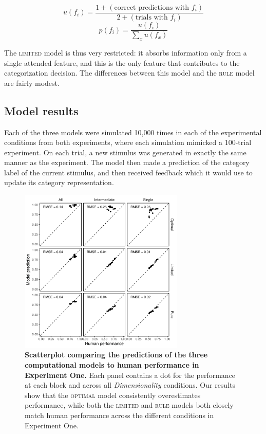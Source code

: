 \documentclass[a4paper, doc, floatsintext]{apa6}
\newcommand{\text}{\mbox}
\begin{document}
\begin{equation}
u(f_{i}) = \frac{ 1 + (\text{correct predictions with } f_{i})}{2 +  (\text{trials with } f_{i})}
\label{limited-prototype-u}
\end{equation}
\begin{equation}
p(f_{i}) = \frac{u(f_{i})}{ \sum_{x} u(f_{x})}
\label{limited-prototype-switch}
\end{equation}

The \textsc{limited} model is thus very restricted: it absorbs information only from a single attended feature, and this is the only feature that contributes to the categorization decision. The differences between this model and the \textsc{rule} model are fairly modest.

\subsection{Model results}

Each of the three models were simulated 10,000 times in each of the experimental conditions from both experiments, where each simulation mimicked a 100-trial experiment. On each trial, a new stimulus was generated in exactly the same manner as the experiment. The model then made a prediction of the category label of the current stimulus, and then received feedback which it would use to update its category representation.

\begin{figure}[h!]
  \begin{center}
    \includegraphics[width=0.7\textwidth]{figures/human-model-correlation-experiment-one.pdf}
    \caption{\small{\textbf{Scatterplot comparing the predictions of the three computational models to human performance in Experiment One.} Each panel contains a dot for the performance at each block and across all \textit{Dimensionality} conditions. Our results show that the \textsc{optimal} model consistently overestimates performance, while both the \textsc{limited} and \textsc{rule} models both closely match human performance across the different conditions in Experiment One.}}
  \label{model-comparison-experiment-one}
  \end{center}
\end{figure}
\end{document}
